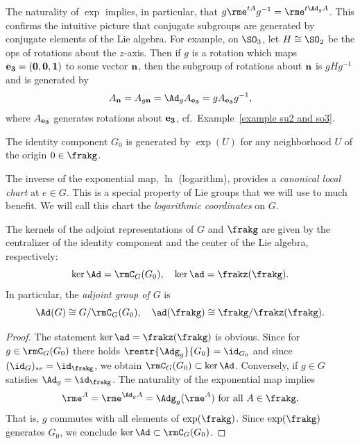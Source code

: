 \begin{rem}
    The naturality of $\exp$ implies, in particular, that $g\rme^{tA}g^{-1}=\rme^{t\Ad_g A}$. This confirms the intuitive picture that conjugate subgroups are generated by conjugate elements of the Lie algebra. For example, on $\SO_3$, let $H\cong\SO_2$ be the \gls{ops} of rotations about the $z$-axis. Then if $g$ is a rotation which maps $\bf{e}_3=(0,0,1)$ to some vector $\bf{n}$, then the subgroup of rotations about $\bf{n}$ is $gHg^{-1}$ and is generated by 
    \[A_{\bf{n}}=A_{g\bf{n}}=\Ad_g A_{\bf{e}_3}=gA_{\bf{e}_3} g^{-1},\] 
    where $A_{\bf{e}_3}$ generates rotations about $\bf{e}_3$, cf.\ Example~\ref{example su2 and so3}.
\end{rem}
\begin{cor}
    The identity component $G_0$ is generated by $\exp(U)$ for any neighborhood $U$ of the origin $0\in\frakg$.
\end{cor}
 

\begin{rem}
    The inverse of the exponential map, $\ln$ (logarithm), provides a \emph{canonical local chart} at $e\in G$. This is a special property of Lie groups that we will use to much benefit. We will call this chart the \emph{logarithmic coordinates} on $G$.
\end{rem}


\begin{prop}\label{prop 5.4.5 RS1 ker(Ad) and ker(ad)}
    The kernels of the adjoint representations of $G$ and $\frakg$ are given by the centralizer of the identity component and the center of the Lie algebra, respectively:
    \[\ker \Ad=\rmC_G(G_0),\quad \ker \ad=\frakz(\frakg).\]
    In particular, the \emph{adjoint group of $G$} is 
    \[\Ad(G)\cong G\slash \rmC_G(G_0),\quad \ad(\frakg)\cong \frakg\slash \frakz(\frakg).\]
\end{prop}
\begin{proof}
    The statement $\ker\ad=\frakz(\frakg)$ is obvious. Since for $g\in \rmC_G(G_0)$ there holds $\restr{\Adg_g}{G_0}=\id_{G_0}$ and since $(\id_G)_{\ast e}=\id_\frakg$, we obtain $\rmC_G(G_0)\subset \ker\Ad$. Conversely, if $g\in G$ satisfies $\Ad_g=\id_\frakg$. The naturality of the exponential map implies 
    \[\rme^A=\rme^{\Ad_g A}=\Adg_g(\rme^A)\text{ for all }A\in\frakg.\]
    That is, $g$ commutes with all elements of $\exp(\frakg)$. Since $\exp(\frakg)$ generates $G_0$, we conclude $\ker\Ad\subset \rmC_G(G_0)$.
\end{proof}

